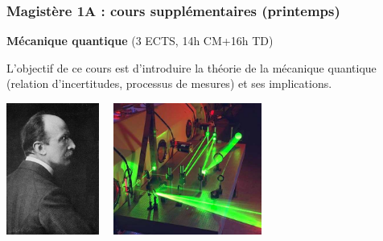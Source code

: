 \documentclass[slidetop,11pt]{beamer}
\begin{document}
\begin{frame}
\begin{center}
\end{center}

\end{frame}

\begin{frame}
\frametitle{Magistère 1A : cours supplémentaires (printemps)}

\textbf{Mécanique quantique} (3 ECTS, 14h CM+16h TD)

L'objectif de ce cours est d'introduire la théorie de la mécanique quantique (relation d'incertitudes, processus de mesures) et ses implications.
\begin{center}
\includegraphics[height=4.3cm]{Max_Planck_Nobel_1918.jpg}$\quad$
\includegraphics[height=4.3cm]{Laser_optique.jpg}
\end{center}
\end{frame}
\end{document}

